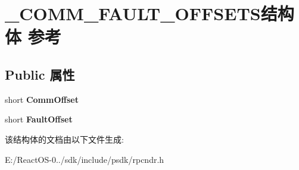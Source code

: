 \hypertarget{struct___c_o_m_m___f_a_u_l_t___o_f_f_s_e_t_s}{}\section{\+\_\+\+C\+O\+M\+M\+\_\+\+F\+A\+U\+L\+T\+\_\+\+O\+F\+F\+S\+E\+T\+S结构体 参考}
\label{struct___c_o_m_m___f_a_u_l_t___o_f_f_s_e_t_s}
\subsection*{Public 属性}
\begin{DoxyCompactItemize}
\item 
\mbox{\label{struct___c_o_m_m___f_a_u_l_t___o_f_f_s_e_t_s_ac45c09004b401092651e22238a7965eb}} 
short {\bfseries Comm\+Offset}
\item 
\mbox{\label{struct___c_o_m_m___f_a_u_l_t___o_f_f_s_e_t_s_ad8b62df17cfe76e547cd74de199b18a8}} 
short {\bfseries Fault\+Offset}
\end{DoxyCompactItemize}


该结构体的文档由以下文件生成\+:\begin{DoxyCompactItemize}
\item 
E\+:/\+React\+O\+S-\/0../sdk/include/psdk/rpcndr.\+h\end{DoxyCompactItemize}
